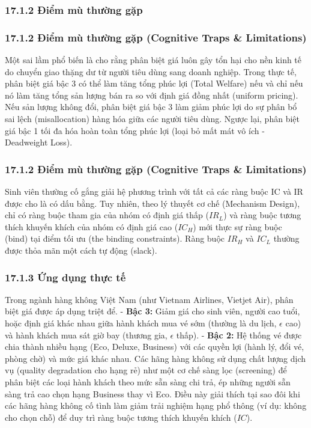 \documentclass[
]{article}
\begin{document}
\subsubsection{17.1.2 Điểm mù thường
gặp}\label{ux111iux1ec3m-muxf9-thux1b0ux1eddng-gux1eb7p-13}

\subsubsection{17.1.2 Điểm mù thường gặp (Cognitive Traps \&
Limitations)}\label{ux111iux1ec3m-muxf9-thux1b0ux1eddng-gux1eb7p-cognitive-traps-limitations-117}

Một sai lầm phổ biến là cho rằng phân biệt giá luôn gây tổn hại cho nền
kinh tế do chuyển giao thặng dư từ người tiêu dùng sang doanh nghiệp.
Trong thực tế, phân biệt giá bậc 3 có thể làm tăng tổng phúc lợi (Total
Welfare) nếu và chỉ nếu nó làm tăng tổng sản lượng bán ra so với định
giá đồng nhất (uniform pricing). Nếu sản lượng không đổi, phân biệt giá
bậc 3 làm giảm phúc lợi do sự phân bổ sai lệch (misallocation) hàng hóa
giữa các người tiêu dùng. Ngược lại, phân biệt giá bậc 1 tối đa hóa hoàn
toàn tổng phúc lợi (loại bỏ mất mát vô ích - Deadweight Loss).

\subsubsection{17.1.2 Điểm mù thường gặp (Cognitive Traps \&
Limitations)}\label{ux111iux1ec3m-muxf9-thux1b0ux1eddng-gux1eb7p-cognitive-traps-limitations-118}

Sinh viên thường cố gắng giải hệ phương trình với tất cả các ràng buộc
IC và IR được cho là có dấu bằng. Tuy nhiên, theo lý thuyết cơ chế
(Mechanism Design), chỉ có ràng buộc tham gia của nhóm có định giá thấp
(\(IR_L\)) và ràng buộc tương thích khuyến khích của nhóm có định giá
cao (\(IC_H\)) mới thực sự ràng buộc (bind) tại điểm tối ưu (the binding
constraints). Ràng buộc \(IR_H\) và \(IC_L\) thường được thỏa mãn một
cách tự động (slack).

\subsubsection{17.1.3 Ứng dụng thực
tế}\label{ux1ee9ng-dux1ee5ng-thux1ef1c-tux1ebf-7}

Trong ngành hàng không Việt Nam (như Vietnam Airlines, Vietjet Air),
phân biệt giá được áp dụng triệt để. - \textbf{Bậc 3:} Giảm giá cho sinh
viên, người cao tuổi, hoặc định giá khác nhau giữa hành khách mua vé sớm
(thường là du lịch, \(\epsilon\) cao) và hành khách mua sát giờ bay
(thương gia, \(\epsilon\) thấp). - \textbf{Bậc 2:} Hệ thống vé được chia
thành nhiều hạng (Eco, Deluxe, Business) với các quyền lợi (hành lý, đổi
vé, phòng chờ) và mức giá khác nhau. Các hãng hàng không sử dụng chất
lượng dịch vụ (quality degradation cho hạng rẻ) như một cơ chế sàng lọc
(screening) để phân biệt các loại hành khách theo mức sẵn sàng chi trả,
ép những người sẵn sàng trả cao chọn hạng Business thay vì Eco. Điều này
giải thích tại sao đôi khi các hãng hàng không cố tình làm giảm trải
nghiệm hạng phổ thông (ví dụ: không cho chọn chỗ) để duy trì ràng buộc
tương thích khuyến khích (\(IC\)).
\end{document}
